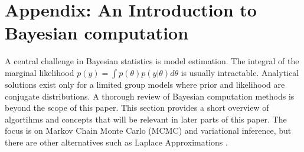 \chapter{Appendix: An Introduction to Bayesian computation}

\label{ch:computation}

A central challenge in Bayesian statistics is model estimation.
The integral of the marginal likelihood $p(y) = \int p(\theta)p(y|\theta)d\theta$ is usually intractable.
Analytical solutions exist only for a limited group models where prior and likelihood are conjugate distributions.
A thorough review of Bayesian computation methods is beyond the scope of this paper.
This section provides a short overview of algortihms and concepts that will be relevant in later parts of this paper.
The focus is on Markov Chain Monte Carlo (MCMC) and variational inference, but there are other alternatives such as Laplace Approximations \citep{gomez-rubio_bayesian_2020}.

